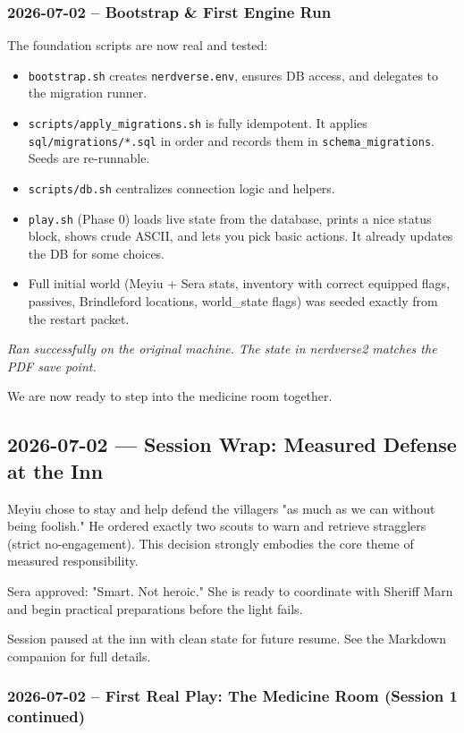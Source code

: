 \documentclass[11pt,a4paper]{article}
\begin{document}
\subsubsection{2026-07-02 -- Bootstrap \& First Engine Run}

The foundation scripts are now real and tested:

\begin{itemize}
  \item \texttt{bootstrap.sh} creates \texttt{nerdverse.env}, ensures DB access, and delegates to the migration runner.
  \item \texttt{scripts/apply\_migrations.sh} is fully idempotent. It applies \texttt{sql/migrations/*.sql} in order and records them in \texttt{schema\_migrations}. Seeds are re-runnable.
  \item \texttt{scripts/db.sh} centralizes connection logic and helpers.
  \item \texttt{play.sh} (Phase 0) loads live state from the database, prints a nice status block, shows crude ASCII, and lets you pick basic actions. It already updates the DB for some choices.
  \item Full initial world (Meyiu + Sera stats, inventory with correct equipped flags, passives, Brindleford locations, world\_state flags) was seeded exactly from the restart packet.
\end{itemize}

\textit{Ran successfully on the original machine. The state in nerdverse2 matches the PDF save point.}

We are now ready to step into the medicine room together.

\subsection{2026-07-02 — Session Wrap: Measured Defense at the Inn}

Meyiu chose to stay and help defend the villagers "as much as we can without being foolish." He ordered exactly two scouts to warn and retrieve stragglers (strict no-engagement). This decision strongly embodies the core theme of measured responsibility.

Sera approved: "Smart. Not heroic." She is ready to coordinate with Sheriff Marn and begin practical preparations before the light fails.

Session paused at the inn with clean state for future resume. See the Markdown companion for full details.

\subsubsection{2026-07-02 -- First Real Play: The Medicine Room (Session 1 continued)}
\end{document}
